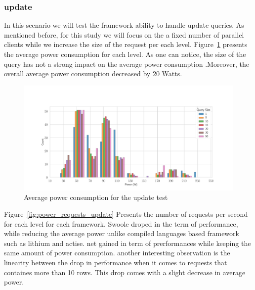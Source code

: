 \subsubsection{update}
In this scenario we will test the framework ability to handle update queries. As mentioned before,  for this study we will focus on the a fixed number of parallel clients while we increase the size of the request per each level.
Figure~\ref{fig:av_power_update} presents the average power consumption for each level. As one can notice, the size of the query has not a strong impact on the average power consumption .Moreover, the overall average power consumption decreased by 20 Watts.
\begin{figure}[hbt]
    \centering
    \includegraphics[width=
        \columnwidth]{imgs/histogram_av_power_cpu_update}
    \caption{Average power consumption for the update test }
    \label{fig:av_power_update}
\end{figure}
Figure~\ref{fig:power_requests_update} Presents the number of requests per second for each level for each framework. Swoole droped in the term of performance, while reducing the average power unlike compiled languages based framework such as lithium and actise. net gained in term of prerformances while keeping the same amount of power consumption. another interesting observation is the linearity between the drop in performance when it comes to requests that containes more than 10 rows. This drop comes with a slight decrease in average power.

